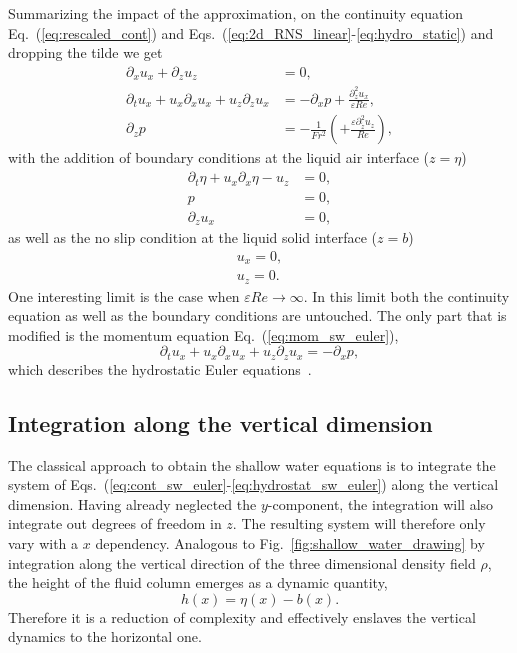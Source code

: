 Summarizing the impact of the approximation, on the continuity equation Eq.~(\ref{eq:rescaled_cont}) and Eqs.~(\ref{eq:2d_RNS_linear}-\ref{eq:hydro_static}) and dropping the tilde we get 
\begin{align}
    \partial_x u_x + \partial_z u_z &= 0, \label{eq:cont_sw_euler}\\
    \partial_t u_x + u_x\partial_x u_x + u_z\partial_{z} u_x &= -\partial_x p + \frac{\partial_z^2 u_x}{\varepsilon Re}, \label{eq:mom_sw_euler}\\
    \partial_z p &= -\frac{1}{Fr^2} \left(+\frac{\varepsilon\partial_{\tilde{z}}^2 u_z}{Re}\right), \label{eq:hydrostat_sw_euler}
\end{align}
with the addition of boundary conditions at the liquid air interface ($z = \eta$)
\begin{align}
    \partial_t \eta + u_x\partial_x\eta - u_z &= 0, \label{eq:sw_boundaries_top_1}\\
    p &= 0, \label{eq:sw_boundaries_top_2}\\
    \partial_z u_x &= 0, \label{eq:sw_boundaries_top_3}
\end{align}
as well as the no slip condition at the liquid solid interface ($z = b$)
\begin{align}
    u_x = 0, \label{eq:no-slip_sw1}\\
    u_z = 0. \label{eq:no-slip_sw2}
\end{align}
One interesting limit is the case when $\varepsilon Re \rightarrow \infty$.
In this limit both the continuity equation as well as the boundary conditions are untouched.
The only part that is modified is the momentum equation Eq.~(\ref{eq:mom_sw_euler}),
\begin{equation}
    \partial_t u_x + u_x\partial_x u_x + u_z\partial_{z} u_x = -\partial_x p,
\end{equation}
which describes the hydrostatic Euler equations~\cite{brenierGeneralizedSolutionsHydrostatic2008}.

\subsection{Integration along the vertical dimension}
\label{subsec:int_sw}
The classical approach to obtain the shallow water equations is to integrate the system of Eqs.~(\ref{eq:cont_sw_euler}-\ref{eq:hydrostat_sw_euler}) along the vertical dimension.
Having already neglected the $y$-component, the integration will also integrate out degrees of freedom in $z$.
The resulting system will therefore only vary with a $x$ dependency.
Analogous to Fig.~\ref{fig:shallow_water_drawing} by integration along the vertical direction of the three dimensional density field $\rho$, the height of the fluid column emerges as a dynamic quantity,
\begin{equation}\label{eq:shallow_water_height}
    h(x) = \eta(x) - b(x).    
\end{equation}
Therefore it is a reduction of complexity and effectively enslaves the vertical dynamics to the horizontal one.

